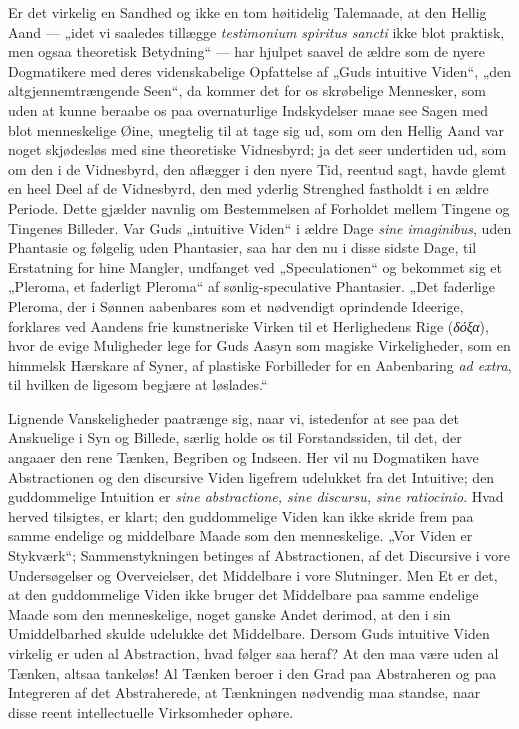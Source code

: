 \documentclass[11pt]{book}
\newcommand{\opage}[1]{\marginnote{\footnotesize\textit{[#1]}}}
\begin{document}
Er det virkelig en Sandhed og ikke en tom høitidelig Talemaade, at den
Hellig Aand --- „idet vi saaledes tillægge \textit{testimonium spiritus
sancti} ikke blot praktisk, men ogsaa theoretisk Betydning“ --- har
hjulpet saavel de ældre som de
\opage{240} \setcounter{footnote}{0}%
nyere Dogmatikere med deres videnskabelige Opfattelse af „Guds intuitive
Viden“, „den altgjennemtrængende Seen“, da kommer det for os skrøbelige
Mennesker, som uden at kunne beraabe os paa overnaturlige Indskydelser
maae see Sagen med blot menneskelige Øine, unegtelig til at tage sig ud,
som om den Hellig Aand var noget skjødesløs med sine theoretiske
Vidnesbyrd; ja det seer undertiden ud, som om den i de Vidnesbyrd, den
aflægger i den nyere Tid, reentud sagt, havde glemt en heel Deel af de
Vidnesbyrd, den med yderlig Strenghed fastholdt i en ældre Periode.
Dette gjælder navnlig om Bestemmelsen af Forholdet mellem Tingene og
Tingenes Billeder. Var Guds „intuitive Viden“ i ældre Dage \textit{sine
imaginibus}, uden Phantasie og følgelig uden Phantasier, saa har den nu
i disse sidste Dage, til Erstatning for hine Mangler, undfanget ved
„Speculationen“ og bekommet sig et „Pleroma, et faderligt Pleroma“ af
sønlig-speculative Phantasier. „Det faderlige Pleroma, der i Sønnen
aabenbares som et nødvendigt oprindende Ideerige, forklares ved Aandens
frie kunstneriske Virken til et Herlighedens Rige (\textit{δόξα}), hvor
de evige Muligheder lege for Guds Aasyn som magiske Virkeligheder, som
en himmelsk Hærskare af Syner, af plastiske Forbilleder for en
Aabenbaring \textit{ad extra}, til hvilken de ligesom begjære at
løslades.“

Lignende Vanskeligheder paatrænge sig, naar vi, istedenfor at see paa
det Anskuelige i Syn og Billede, særlig holde os til Forstandssiden, til
det, der angaaer den rene Tænken, Begriben og Indseen. Her vil nu
Dogmatiken have Abstractionen og den discursive Viden ligefrem udelukket
fra det Intuitive; den guddommelige Intuition er \textit{sine
abstractione, sine discursu, sine ratiocinio}. Hvad herved tilsigtes, er
klart; den guddommelige Viden kan ikke skride frem paa samme endelige og
middelbare Maade som den menneskelige. „Vor Viden er Stykværk“;
Sammenstykningen betinges af Abstractionen, af det Discursive i vore
Undersøgelser og Overveielser,
\opage{241} \setcounter{footnote}{0}%
det Middelbare i vore Slutninger. Men Et er det, at den guddommelige
Viden ikke bruger det Middelbare paa samme endelige Maade som den
menneskelige, noget ganske Andet derimod, at den i sin Umiddelbarhed
skulde udelukke det Middelbare. Dersom Guds intuitive Viden virkelig er
uden al Abstraction, hvad følger saa heraf? At den maa være uden al
Tænken, altsaa tankeløs! Al Tænken beroer i den Grad paa Abstraheren og
paa Integreren af det Abstraherede, at Tænkningen nødvendig maa standse,
naar disse reent intellectuelle Virksomheder ophøre.
\end{document}
